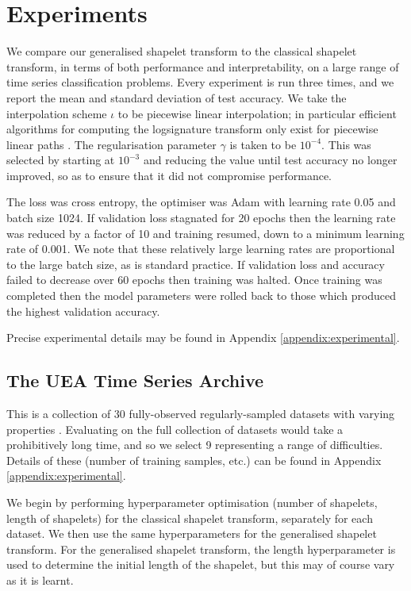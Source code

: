 \documentclass{article}
\theoremstyle{plain}
\theoremstyle{definition}
\begin{document}
	
\section{Experiments}\label{section:experiments}
We compare our generalised shapelet transform to the classical shapelet transform, in terms of both performance and interpretability, on a large range of time series classification problems. Every experiment is run three times, and we report the mean and standard deviation of test accuracy. We take the interpolation scheme $\iota$ to be piecewise linear interpolation; in particular efficient algorithms for computing the logsignature transform only exist for piecewise linear paths \cite{signatory}. The regularisation parameter $\gamma$ is taken to be $10^{-4}$. This was selected by starting at $10^{-3}$ and reducing the value until test accuracy no longer improved, so as to ensure that it did not compromise performance.

The loss was cross entropy, the optimiser was Adam \cite{kingma2015} with learning rate 0.05 and batch size 1024. If validation loss stagnated for 20 epochs then the learning rate was reduced by a factor of 10 and training resumed, down to a minimum learning rate of 0.001. We note that these relatively large learning rates are proportional to the large batch size, as is standard practice. If validation loss and accuracy failed to decrease over 60 epochs then training was halted. Once training was completed then the model parameters were rolled back to those which produced the highest validation accuracy.

Precise experimental details may be found in Appendix \ref{appendix:experimental}.

\subsection{The UEA Time Series Archive}
This is a collection of 30 fully-observed regularly-sampled datasets with varying properties \cite{bagnall2018uea}. Evaluating on the full collection of datasets would take a prohibitively long time, and so we select 9 representing a range of difficulties. Details of these (number of training samples, etc.) can be found in Appendix \ref{appendix:experimental}.

We begin by performing hyperparameter optimisation (number of shapelets, length of shapelets) for the classical shapelet transform, separately for each dataset. We then use the same hyperparameters for the generalised shapelet transform. For the generalised shapelet transform, the length hyperparameter is used to determine the initial length of the shapelet, but this may of course vary as it is learnt.
\end{document}
